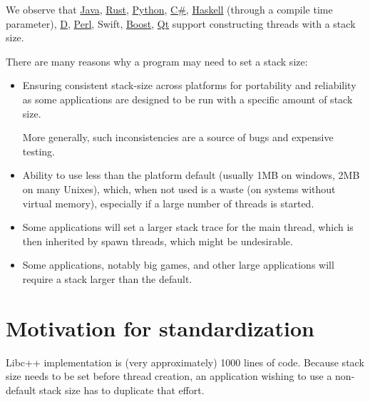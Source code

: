 \documentclass{wg21}
\begin{document}
We observe that \href{https://docs.oracle.com/javase/7/docs/api/java/lang/Thread.html#Thread()}{Java}, \href{https://doc.rust-lang.org/std/thread/struct.Builder.html}{Rust}, 
\href{https://docs.python.org/3/library/threading.html}{Python}, \href{https://docs.microsoft.com/en-us/dotnet/api/system.threading.thread.-ctor?view=netframework-4.8#System_Threading_Thread__ctor_System_Threading_ParameterizedThreadStart_System_Int32_}{C\#}, \href{https://downloads.haskell.org/~ghc/latest/docs/html/users_guide/runtime_control.html}{Haskell} (through a compile time parameter), \href{https://dlang.org/phobos/core_thread_osthread.htm}{D}, \href{https://perldoc.perl.org/threads.html#THREAD-STACK-SIZE}{Perl}, Swift,
\href{https://www.boost.org/doc/libs/1_72_0/doc/html/thread/thread_management.html#thread.thread_management.tutorial.attributes}{Boost},  \href{https://doc.qt.io/qt-5/qthread.html#setStackSize}{Qt}
support constructing threads with a stack size.

There are many reasons why a program may need to set a stack size:
\begin{itemize}
\item Ensuring consistent stack-size across platforms for portability and reliability as some applications are designed to be run with a specific amount of stack size. 

More generally, such inconsistencies are a source of bugs and expensive testing.

\item Ability to use less than the platform default (usually 1MB on windows, 2MB on many Unixes), which, when not used is a waste (on systems without virtual memory), especially if a large number of threads is started.
\item Some applications will set a larger stack trace for the main thread, which is then inherited by spawn threads, which might be undesirable.
\item Some applications, notably big games, and other large applications will require a stack larger than the default.
\end{itemize}

\section{Motivation for standardization}

Libc++  implementation is (very approximately) 1000 lines of code.
Because stack size needs to be set before thread creation, an application wishing to use a non-default stack size has to duplicate that effort.
\end{document}
